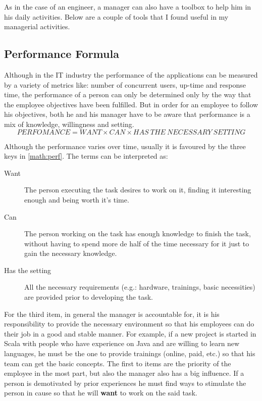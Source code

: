 As in the case of an engineer, a manager can also have a toolbox to help him in his daily activities. Below are a couple of tools that I found useful in my managerial activities.

\subsection{Performance Formula}
\label{subsec:formula}
Although in the IT industry the performance of the applications can be measured by a variety of metrics like: number of concurrent users, up-time and response time, the performance of a person can only be determined only by the way that the employee objectives have been fulfilled. 
But in order for an employee to follow his objectives, both he and his manager have to be aware that performance is a mix of knowledge, willingness and setting.
\begin{equation}
\label{math:perf}
PERFOMANCE = WANT \times CAN \times HAS\ THE\ NECESSARY\ SETTING
\end{equation}

Although the performance varies over time, usually it is favoured by the three keys in \cref{math:perf}. The terms can be interpreted as:
\begin{description}
\item[Want] The person executing the task desires to work on it, finding it interesting enough and being worth it's time.
\item[Can] The person working on the task has enough knowledge to finish the task, without having to spend more de half of the time necessary for it just to gain the necessary knowledge. 
\item[Has the setting] All the necessary requirements (e.g.: hardware, trainings, basic necessities) are provided prior to developing the task.
\end{description}

For the third item, in general the manager is accountable for, it is his responsibility to provide the necessary environment so that his employees can do their job in a good and stable manner. For example, if a new project is started in Scala with people who have experience on Java and are willing to learn new languages, he must be the one to provide trainings (online, paid, etc.) so that his team can get the basic concepts. The first to items are the priority of the employee in the most part, but also the manager also has a big influence. If a person is demotivated by prior experiences he must find ways to stimulate the person in cause so that he will \textbf{want} to work on the said task.

